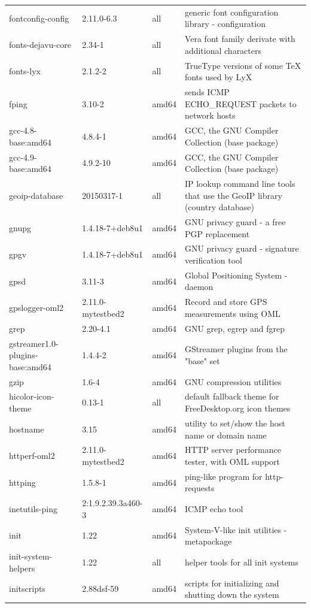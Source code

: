 \documentclass[a4paper,10pt]{article}
\begin{document}
\begin{appendices}
{\begin{longtable}{p{3.25cm}@{\hspace{0.25cm}}p{4cm}@{\hspace{0.25cm}}l@{\hspace{0.25cm}}p{7cm}}
fontconfig-config	&	2.11.0-6.3	&	all	&	generic font configuration library - configuration	\\
fonts-dejavu-core	&	2.34-1	&	all	&	Vera font family derivate with additional characters	\\
fonts-lyx	&	2.1.2-2	&	all	&	TrueType versions of some TeX fonts used by LyX	\\
fping	&	3.10-2	&	amd64	&	sends ICMP ECHO\_REQUEST packets to network hosts	\\
gcc-4.8-base:amd64	&	4.8.4-1	&	amd64	&	GCC, the GNU Compiler Collection (base package)	\\
gcc-4.9-base:amd64	&	4.9.2-10	&	amd64	&	GCC, the GNU Compiler Collection (base package)	\\
geoip-database	&	20150317-1	&	all	&	IP lookup command line tools that use the GeoIP library (country database)	\\
gnupg	&	1.4.18-7+deb8u1	&	amd64	&	GNU privacy guard - a free PGP replacement	\\
gpgv	&	1.4.18-7+deb8u1	&	amd64	&	GNU privacy guard - signature verification tool	\\
gpsd	&	3.11-3	&	amd64	&	Global Positioning System - daemon	\\
gpslogger-oml2	&	2.11.0-mytestbed2	&	amd64	&	Record and store GPS measurements using OML	\\
grep	&	2.20-4.1	&	amd64	&	GNU grep, egrep and fgrep	\\
gstreamer1.0-plugins-base:amd64	&	1.4.4-2	&	amd64	&	GStreamer plugins from the "base" set	\\
gzip	&	1.6-4	&	amd64	&	GNU compression utilities	\\
hicolor-icon-theme	&	0.13-1	&	all	&	default fallback theme for FreeDesktop.org icon themes	\\
hostname	&	3.15	&	amd64	&	utility to set/show the host name or domain name	\\
httperf-oml2	&	2.11.0-mytestbed2	&	amd64	&	HTTP server performance tester, with OML support	\\
httping	&	1.5.8-1	&	amd64	&	ping-like program for http-requests	\\
inetutils-ping	&	2:1.9.2.39.3a460-3	&	amd64	&	ICMP echo tool	\\
init	&	1.22	&	amd64	&	System-V-like init utilities - metapackage	\\
init-system-helpers	&	1.22	&	all	&	helper tools for all init systems	\\
initscripts	&	2.88dsf-59	&	amd64	&	scripts for initializing and shutting down the system	\\

\end{longtable}}
\end{appendices}
\end{document}
